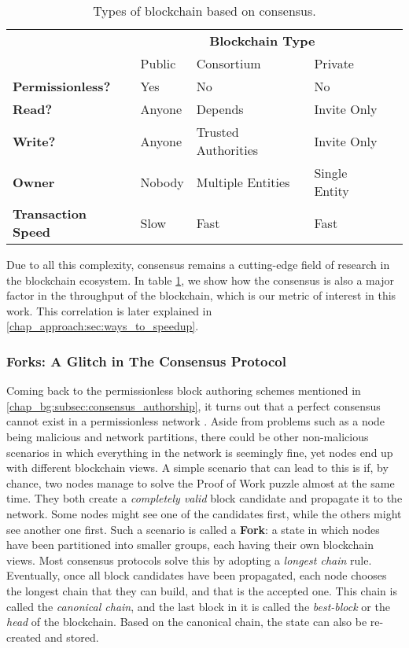 \begin{table}[ht]
\centering
	\caption{Types of blockchain based on consensus.}
	\label{table:blockchain_types}
	\begin{tabular}{lllll}
													& \multicolumn{3}{c}{\textbf{Blockchain Type}} &
													\\
													& Public & Consortium          & Private       &
	\\ \cline{1-4} \multicolumn{1}{l|}{\textbf{Permissionless?}}   & Yes    & No                  &
	No            &  \\
	\multicolumn{1}{l|}{\textbf{Read?}}             & Anyone & Depends             & Invite Only   &
	\\
	\multicolumn{1}{l|}{\textbf{Write?}}            & Anyone & Trusted Authorities & Invite Only   &
	\\
	\multicolumn{1}{l|}{\textbf{Owner}}             & Nobody & Multiple Entities   & Single Entity &
	\\
	\multicolumn{1}{l|}{\textbf{Transaction Speed}} & Slow   & Fast                & Fast          & \\ \hline
	\end{tabular}
\end{table}

Due to all this complexity, consensus remains a cutting-edge field of research in the blockchain
ecosystem. In table \ref{table:blockchain_types}, we show how the consensus is also a major factor in the throughput of the blockchain, which is our metric of interest in this
work. This correlation is later explained in \ref{chap_approach:sec:ways_to_speedup}.

\subsubsection{Forks: A Glitch in The Consensus Protocol}

Coming back to the permissionless block authoring schemes mentioned in
\ref{chap_bg:subsec:consensus_authorship}, it turns out that a perfect consensus cannot exist in a
permissionless network \cite{wangSurveyConsensusMechanisms2019}. Aside from problems such as a node
being malicious and network partitions, there could be other non-malicious scenarios in which
everything in the network is seemingly fine, yet nodes end up with different blockchain views. A
simple scenario that can lead to this is if, by chance, two nodes manage to solve the Proof of Work
puzzle almost at the same time. They both create a \textit{completely valid} block candidate and
propagate it to the network. Some nodes might see one of the candidates first, while the others might see
another one first. Such a scenario is called a \textbf{Fork}: a state in which nodes have been
partitioned into smaller groups, each having their own blockchain views. Most consensus protocols
solve this by adopting a \textit{longest chain} rule. Eventually, once all block candidates have
been propagated, each node chooses the longest chain that they can build, and that is the accepted
one. This chain is called the \textit{canonical chain}, and the last block in it is called the
\textit{best-block} or the \textit{head} of the blockchain. Based on the canonical chain, the state can
also be re-created and stored.

